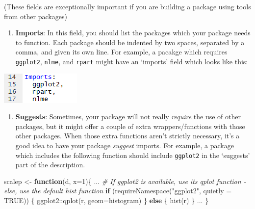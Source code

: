 \documentclass[
]{book}
\newenvironment{Shaded}{\begin{snugshade}}{\end{snugshade}}
\newcommand{\AttributeTok}[1]{\textcolor[rgb]{0.77,0.63,0.00}{#1}}
\newcommand{\CommentTok}[1]{\textcolor[rgb]{0.56,0.35,0.01}{\textit{#1}}}
\newcommand{\ConstantTok}[1]{\textcolor[rgb]{0.00,0.00,0.00}{#1}}
\newcommand{\ControlFlowTok}[1]{\textcolor[rgb]{0.13,0.29,0.53}{\textbf{#1}}}
\newcommand{\DecValTok}[1]{\textcolor[rgb]{0.00,0.00,0.81}{#1}}
\newcommand{\FunctionTok}[1]{\textcolor[rgb]{0.00,0.00,0.00}{#1}}
\newcommand{\NormalTok}[1]{#1}
\newcommand{\OtherTok}[1]{\textcolor[rgb]{0.56,0.35,0.01}{#1}}
\newcommand{\SpecialCharTok}[1]{\textcolor[rgb]{0.00,0.00,0.00}{#1}}
\newcommand{\StringTok}[1]{\textcolor[rgb]{0.31,0.60,0.02}{#1}}
\providecommand{\tightlist}{%
  \setlength{\itemsep}{0pt}\setlength{\parskip}{0pt}}
\begin{document}
(These fields are exceptionally important if you are building a package using tools from other packages)

\begin{enumerate}
\def\labelenumi{\arabic{enumi}.}
\setcounter{enumi}{11}
\tightlist
\item
  \textbf{Imports}: In this field, you should list the packages which your package needs to function. Each package should be indented by two spaces, separated by a comma, and given its own line. For example, a pacakge which requires \texttt{ggplot2}, \texttt{nlme}, and \texttt{rpart} might have an `imports' field which looks like this:
\end{enumerate}

\includegraphics{images/packageSS/imports.PNG}

\begin{enumerate}
\def\labelenumi{\arabic{enumi}.}
\setcounter{enumi}{12}
\tightlist
\item
  \textbf{Suggests}: Sometimes, your package will not really \emph{require} the use of other packages, but it might offer a couple of extra wrappers/functions with those other packages. When those extra functions aren't strictly necessary, it's a good idea to have your package \emph{suggest} imports. For example, a package which includes the following function should include \texttt{ggplot2} in the `suggests' part of the description.
\end{enumerate}

\begin{Shaded}
\begin{Highlighting}[]
\NormalTok{scalep }\OtherTok{\textless{}{-}} \ControlFlowTok{function}\NormalTok{(d, }\AttributeTok{x=}\DecValTok{1}\NormalTok{)\{}
\NormalTok{  ...}
  \CommentTok{\# If ggplot2 is available, use its qplot function {-} else, use the default hist function}
  \ControlFlowTok{if}\NormalTok{ (}\FunctionTok{requireNamespace}\NormalTok{(}\StringTok{"ggplot2"}\NormalTok{, }\AttributeTok{quietly =} \ConstantTok{TRUE}\NormalTok{)) \{}
\NormalTok{    ggplot2}\SpecialCharTok{::}\FunctionTok{qplot}\NormalTok{(r, }\AttributeTok{geom=}\StringTok{\textquotesingle{}histogram\textquotesingle{}}\NormalTok{)}
\NormalTok{  \} }\ControlFlowTok{else}\NormalTok{ \{}
    \FunctionTok{hist}\NormalTok{(r)}
\NormalTok{  \}}
\NormalTok{  ...}
\NormalTok{\}}
\end{Highlighting}
\end{Shaded}
\end{document}
